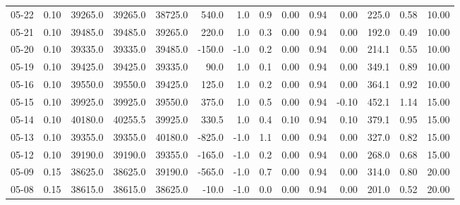 \begin{threeparttable}
{\begin{tabular}{lrrrrrrrrrrrrr}
  05-22 &     0.10 & 39265.0 & 39265.0 & 38725.0 &      540.0 &                      1.0 &                 0.9 &       0.00 &      0.94 &           0.00 &            225.0 &            0.58 &                  10.00 \\
  05-21 &     0.10 & 39485.0 & 39485.0 & 39265.0 &      220.0 &                      1.0 &                 0.3 &       0.00 &      0.94 &           0.00 &            192.0 &            0.49 &                  10.00 \\
  05-20 &     0.10 & 39335.0 & 39335.0 & 39485.0 &     -150.0 &                     -1.0 &                 0.2 &       0.00 &      0.94 &           0.00 &            214.1 &            0.55 &                  10.00 \\
  05-19 &     0.10 & 39425.0 & 39425.0 & 39335.0 &       90.0 &                      1.0 &                 0.1 &       0.00 &      0.94 &           0.00 &            349.1 &            0.89 &                  10.00 \\
  05-16 &     0.10 & 39550.0 & 39550.0 & 39425.0 &      125.0 &                      1.0 &                 0.2 &       0.00 &      0.94 &           0.00 &            364.1 &            0.92 &                  10.00 \\
  05-15 &     0.10 & 39925.0 & 39925.0 & 39550.0 &      375.0 &                      1.0 &                 0.5 &       0.00 &      0.94 &          -0.10 &            452.1 &            1.14 &                  15.00 \\
  05-14 &     0.10 & 40180.0 & 40255.5 & 39925.0 &      330.5 &                      1.0 &                 0.4 &       0.10 &      0.94 &           0.10 &            379.1 &            0.95 &                  15.00 \\
  05-13 &     0.10 & 39355.0 & 39355.0 & 40180.0 &     -825.0 &                     -1.0 &                 1.1 &       0.00 &      0.94 &           0.00 &            327.0 &            0.82 &                  15.00 \\
  05-12 &     0.10 & 39190.0 & 39190.0 & 39355.0 &     -165.0 &                     -1.0 &                 0.2 &       0.00 &      0.94 &           0.00 &            268.0 &            0.68 &                  15.00 \\
  05-09 &     0.15 & 38625.0 & 38625.0 & 39190.0 &     -565.0 &                     -1.0 &                 0.7 &       0.00 &      0.94 &           0.00 &            314.0 &            0.80 &                  20.00 \\
  05-08 &     0.15 & 38615.0 & 38615.0 & 38625.0 &      -10.0 &                     -1.0 &                 0.0 &       0.00 &      0.94 &           0.00 &            201.0 &            0.52 &                  20.00 \\

\end{tabular}}
\end{threeparttable}
